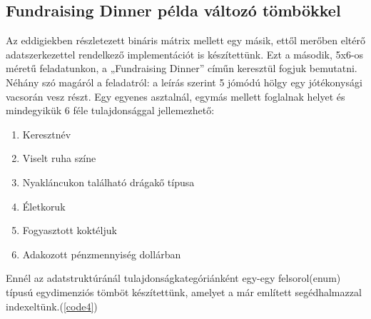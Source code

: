 \documentclass[12pt,a4paper]{report}
\begin{document}
\subsection{Fundraising Dinner példa változó tömbökkel}
\label{sec_fundraising}

    Az eddigiekben részletezett bináris mátrix mellett egy másik, ettől merőben eltérő adatszerkezettel rendelkező implementációt is készítettünk.
    Ezt a második, 5x6-os méretű feladatunkon, a „Fundraising Dinner” címűn keresztül fogjuk bemutatni.
    Néhány szó magáról a feladatról: a leírás szerint 5 jómódú hölgy egy jótékonysági vacsorán vesz részt.
    Egy egyenes asztalnál, egymás mellett foglalnak helyet és mindegyikük 6 féle tulajdonsággal jellemezhető:
    \begin{enumerate}
    	\item Keresztnév
    	\item Viselt ruha színe
    	\item Nyakláncukon található drágakő típusa
    	\item Életkoruk
    	\item Fogyasztott koktéljuk
    	\item Adakozott pénzmennyiség dollárban
    \end{enumerate}
    Ennél az adatstruktúránál tulajdonságkategóriánként egy-egy felsorol(enum) típusú egydimenziós tömböt készítettünk, amelyet a már említett segédhalmazzal indexeltünk.(\ref{code4})

    
\end{document}
